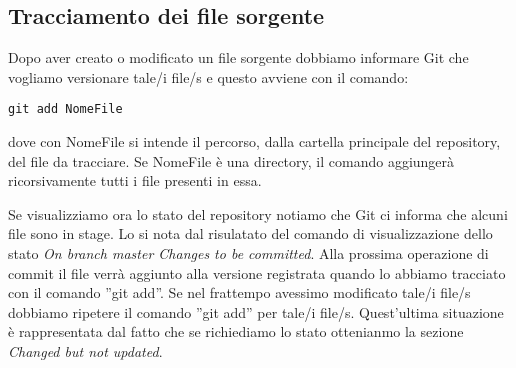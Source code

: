 \subsection{Tracciamento dei file sorgente}
Dopo aver creato o modificato un file sorgente dobbiamo informare Git che vogliamo versionare tale/i file/s e questo avviene con il comando:

\begin{center}
\texttt{git add NomeFile}
\end{center}

dove con NomeFile si intende il percorso, dalla cartella principale del repository, del file da tracciare. Se NomeFile è una directory, il comando aggiungerà ricorsivamente tutti i file presenti in essa.

Se visualizziamo ora lo stato del repository notiamo che Git ci informa che alcuni file sono in stage. Lo si nota dal risulatato del comando di visualizzazione dello stato \textit{On branch master Changes to be committed}. Alla prossima operazione di commit il file verrà aggiunto alla versione registrata quando lo abbiamo tracciato con il comando ''git add''. Se nel frattempo avessimo modificato tale/i file/s dobbiamo ripetere il comando ''git add'' per tale/i file/s. Quest'ultima situazione è rappresentata dal fatto che se richiediamo lo stato ottenianmo la sezione \textit{Changed but not updated}.